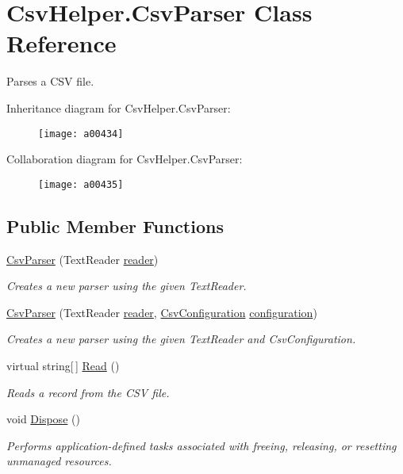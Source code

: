 \hypertarget{a00070}{\section{Csv\-Helper.\-Csv\-Parser Class Reference}
\label{a00070}
}


Parses a C\-S\-V file.  




Inheritance diagram for Csv\-Helper.\-Csv\-Parser\-:
\nopagebreak
\begin{figure}[H]
\begin{center}
\leavevmode
\texttt{[image: a00434]}
\end{center}
\end{figure}


Collaboration diagram for Csv\-Helper.\-Csv\-Parser\-:
\nopagebreak
\begin{figure}[H]
\begin{center}
\leavevmode
\texttt{[image: a00435]}
\end{center}
\end{figure}
\subsection*{Public Member Functions}
\begin{DoxyCompactItemize}
\item 
\hyperlink{a00070_a28afb6761bc195a6f20c284c46811b76}{Csv\-Parser} (Text\-Reader \hyperlink{a00070_a6ab23daf45e84a211b4010c213504f7e}{reader})
\begin{DoxyCompactList}\small\item\em Creates a new parser using the given Text\-Reader. \end{DoxyCompactList}\item 
\hyperlink{a00070_a94820d35d587215da53e0a5f2bf229d0}{Csv\-Parser} (Text\-Reader \hyperlink{a00070_a6ab23daf45e84a211b4010c213504f7e}{reader}, \hyperlink{a00065}{Csv\-Configuration} \hyperlink{a00070_aeb171813d1526839ccd41d60ab6483b2}{configuration})
\begin{DoxyCompactList}\small\item\em Creates a new parser using the given Text\-Reader and Csv\-Configuration. \end{DoxyCompactList}\item 
virtual string\mbox{[}$\,$\mbox{]} \hyperlink{a00070_a8e938842c6267343128babd111df9710}{Read} ()
\begin{DoxyCompactList}\small\item\em Reads a record from the C\-S\-V file. \end{DoxyCompactList}\item 
void \hyperlink{a00070_aa13f93a198206179cd19cdc12332d842}{Dispose} ()
\begin{DoxyCompactList}\small\item\em Performs application-\/defined tasks associated with freeing, releasing, or resetting unmanaged resources. \end{DoxyCompactList}\end{DoxyCompactItemize}
